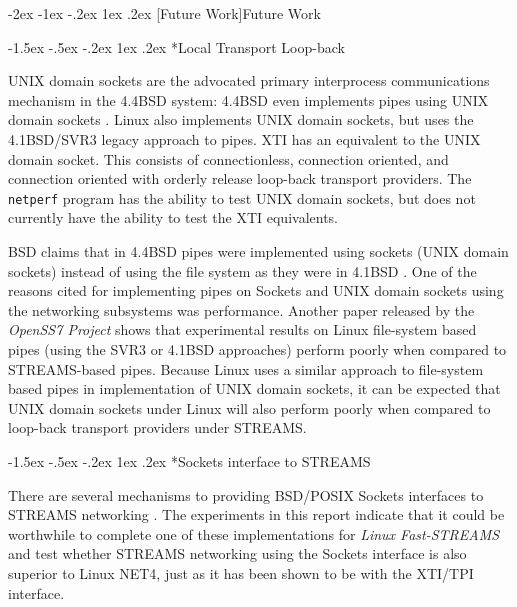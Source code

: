 \documentclass[letterpaper,final,notitlepage,twocolumn,10pt,twoside]{article}
\makeatletter
\renewcommand\section{\@startsection {section}{1}{\z@}%
                                   {-2ex \@plus -1ex \@minus -.2ex}%
                                   {1ex \@plus .2ex}%
                                   {\normalfont\large\bfseries}}
\renewcommand\subsection{\@startsection{subsection}{2}{\z@}%
                                     {-1.5ex \@plus -.5ex \@minus -.2ex}%
                                     {1ex \@plus .2ex}%
                                     {\normalfont\normalsize\bfseries}}
\makeatother
\begin{document}
\section[Future Work]{Future Work}

\subsection*{Local Transport Loop-back}

UNIX domain sockets are the advocated primary interprocess communications
mechanism in the 4.4BSD system: 4.4BSD even implements pipes using UNIX domain
sockets \cite[]{bsd}.  Linux also implements UNIX domain sockets, but uses the
4.1BSD/SVR3 legacy approach to pipes.  XTI has an equivalent to the UNIX
domain socket.  This consists of connectionless, connection oriented, and
connection oriented with orderly release loop-back transport providers.  The
\texttt{netperf} program has the ability to test UNIX domain sockets, but does
not currently have the ability to test the XTI equivalents.

BSD claims that in 4.4BSD pipes were implemented using sockets (UNIX domain
sockets) instead of using the file system as they were in 4.1BSD \cite[]{bsd}.
One of the reasons cited for implementing pipes on Sockets and UNIX domain
sockets using the networking subsystems was performance.  Another paper
released by the \textsl{OpenSS7 Project} \cite[]{openss7} shows that
experimental results on Linux file-system based pipes (using the SVR3 or
4.1BSD approaches) perform poorly when compared to STREAMS-based pipes.
Because Linux uses a similar approach to file-system based pipes in
implementation of UNIX domain sockets, it can be expected that UNIX domain
sockets under Linux will also perform poorly when compared to loop-back
transport providers under STREAMS.

\subsection*{Sockets interface to STREAMS}

There are several mechanisms to providing BSD/POSIX Sockets interfaces to
STREAMS networking \cite[]{impbsd} \cite[]{socklib}.  The experiments in this
report indicate that it could be worthwhile to complete one of these
implementations for \textsl{Linux Fast-STREAMS} \cite[]{strsock} and test
whether STREAMS networking using the Sockets interface is also superior to
Linux NET4, just as it has been shown to be with the XTI/TPI interface.
\end{document}
